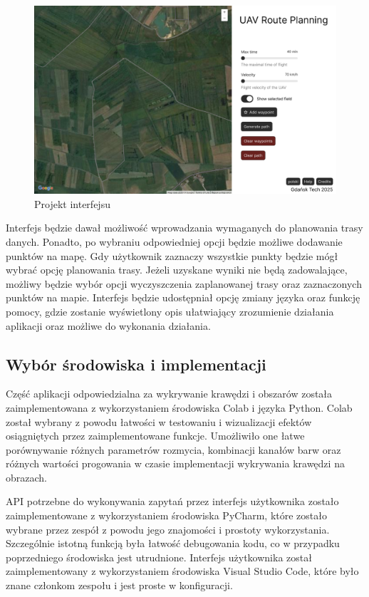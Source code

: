 \begin{figure}[H]
    \centering
    \includegraphics[width=15cm]{images/Projekt_interfejsu.png}
    \caption{Projekt interfejsu}
\end{figure}

Interfejs będzie dawał możliwość wprowadzania wymaganych do planowania trasy danych. Ponadto, po wybraniu odpowiedniej opcji będzie możliwe dodawanie punktów na mapę. Gdy użytkownik zaznaczy wszystkie punkty będzie mógł wybrać opcję planowania trasy. Jeżeli uzyskane wyniki nie będą zadowalające, możliwy będzie wybór opcji wyczyszczenia zaplanowanej trasy oraz zaznaczonych punktów na mapie. Interfejs będzie udostępniał opcję zmiany języka oraz funkcję pomocy, gdzie zostanie wyświetlony opis ułatwiający zrozumienie działania aplikacji oraz możliwe do wykonania działania.

\subsection{Wybór środowiska i implementacji}

Część aplikacji odpowiedzialna za wykrywanie krawędzi i obszarów została zaimplementowana z wykorzystaniem środowiska Colab i języka Python. Colab został wybrany z powodu łatwości w testowaniu i wizualizacji efektów osiągniętych przez zaimplementowane funkcje. Umożliwiło one łatwe porównywanie różnych parametrów rozmycia, kombinacji kanałów barw oraz różnych wartości progowania w czasie implementacji wykrywania krawędzi na obrazach.

API potrzebne do wykonywania zapytań przez interfejs użytkownika zostało zaimplementowane z wykorzystaniem środowiska PyCharm, które zostało wybrane przez zespół z powodu jego znajomości i prostoty wykorzystania. Szczególnie istotną funkcją była łatwość debugowania kodu, co w przypadku poprzedniego środowiska jest utrudnione.
Interfejs użytkownika został zaimplementowany z wykorzystaniem środowiska Visual Studio Code, które było znane członkom zespołu i jest proste w konfiguracji.

